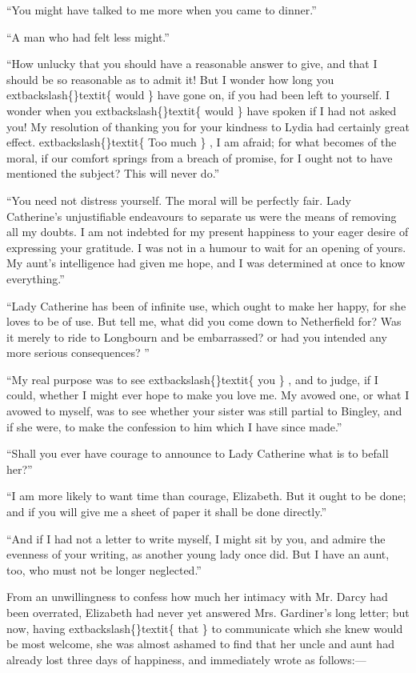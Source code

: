 \documentclass[10pt]{book}
\begin{document}
   “You might have talked to me more when you came to dinner.”
  

   “A man who had felt less might.”
  

   “How unlucky that you should have a reasonable answer to give, and that
I should be so reasonable as to admit it! But I wonder how long you
   	extbackslash\{\}textit\{
    would
   \}
   have gone on, if you had been left to yourself. I wonder when
you
   	extbackslash\{\}textit\{
    would
   \}
   have spoken if I had not asked you! My resolution of
thanking you for your kindness to Lydia had certainly great effect.
   	extbackslash\{\}textit\{
    Too
much
   \}
   , I am afraid; for what becomes of the moral, if our comfort
springs from a breach of promise, for I ought not to have mentioned the
subject? This will never do.”
  

   “You need not distress yourself. The moral will be perfectly fair. Lady
Catherine’s unjustifiable endeavours to separate us were the means of
removing all my doubts. I am not indebted for my present happiness to
your eager desire of expressing your gratitude. I was not in a humour to
wait for an opening of yours. My aunt’s intelligence had given me hope,
and I was determined at once to know everything.”
  

   “Lady Catherine has been of infinite use, which ought to make her happy,
for she loves to be of use. But tell me, what did you come down to
Netherfield for? Was it merely to ride to Longbourn and be embarrassed?
or had you intended any more serious consequences?
   ”
  

   “My real purpose was to see
   	extbackslash\{\}textit\{
    you
   \}
   , and to judge, if I could, whether I
might ever hope to make you love me. My avowed one, or what I avowed to
myself, was to see whether your sister was still partial to Bingley, and
if she were, to make the confession to him which I have since made.”
  

   “Shall you ever have courage to announce to Lady Catherine what is to
befall her?”
  

   “I am more likely to want time than courage, Elizabeth. But it ought to
be done; and if you will give me a sheet of paper it shall be done
directly.”
  

   “And if I had not a letter to write myself, I might sit by you, and
admire the evenness of your writing, as another young lady once did. But
I have an aunt, too, who must not be longer neglected.”
  

   From an unwillingness to confess how much her intimacy with Mr. Darcy
had been overrated, Elizabeth had never yet answered Mrs. Gardiner’s
long letter; but now, having
   	extbackslash\{\}textit\{
    that
   \}
   to communicate which she knew would
be most welcome, she was almost ashamed to find that her uncle and aunt
had already lost three days of happiness, and immediately wrote as
follows:—
  
\end{document}
